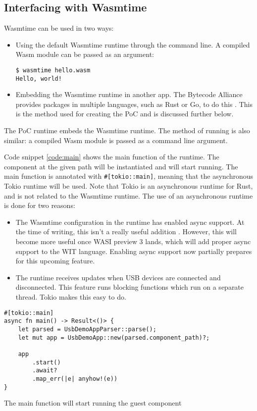 \subsection{Interfacing with Wasmtime}
Wasmtime can be used in two ways: 
\begin{itemize}
\item Using the default Wasmtime runtime through the command line. A compiled \acrshort{Wasm} module can be passed as an argument:
\begin{verbatim}
$ wasmtime hello.wasm
Hello, world!
\end{verbatim}
\item Embedding the Wasmtime runtime in another app. The Bytecode Alliance provides packages in multiple languages, such as Rust or Go, to do this \cite{wasmtime_website}. This is the method used for creating the \acrshort{PoC} and is discussed further below.
\end{itemize}

The \acrshort{PoC} runtime embeds the Wasmtime runtime. The method of running is also similar: a compiled \acrshort{Wasm} module is passed as a command line argument.

Code snippet \ref{code:main} shows the main function of the runtime. The component at the given path will be instantiated and will start running. The main function is annotated with \texttt{\#[tokio::main]}, meaning that the asynchronous Tokio runtime \cite{tokio} will be used. Note that Tokio is an asynchronous runtime for Rust, and is not related to the Wasmtime runtime. The use of an asynchronous runtime is done for two reasons:
\begin{itemize}
\item The Wasmtime configuration in the runtime has enabled async support. At the time of writing, this isn't a really useful addition \cite{wasmtime_async_config}. However, this will become more useful once \acrshort{WASI} preview 3 lands, which will add proper async support to the \acrshort{WIT} language. Enabling async support now partially prepares for this upcoming feature.

\item The runtime receives updates when USB devices are connected and disconnected. This feature runs blocking functions which run on a separate thread. Tokio makes this easy to do.
\end{itemize}


\begin{code}
\begin{verbatim}
#[tokio::main]
async fn main() -> Result<()> {
	let parsed = UsbDemoAppParser::parse();
	let mut app = UsbDemoApp::new(parsed.component_path)?;

	app
		.start()
		.await?
		.map_err(|e| anyhow!(e))
}
\end{verbatim}
\caption{The main function will start running the guest component}
\label{code:main}
\end{code}

